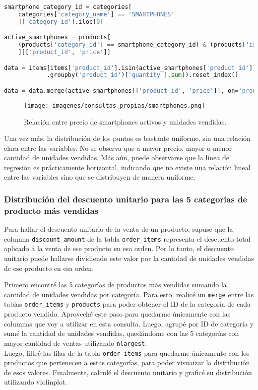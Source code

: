 \begin{lstlisting}[language=Python, xleftmargin=40pt, xrightmargin=40pt]
smartphone_category_id = categories[
    categories['category_name'] == 'SMARTPHONES'
    ]['category_id'].iloc[0]

active_smartphones = products[
    (products['category_id'] == smartphone_category_id) & (products['is_active'])
    ][['product_id', 'price']]

data = items[items['product_id'].isin(active_smartphones['product_id'])]
            .groupby('product_id')['quantity'].sum().reset_index()

data = data.merge(active_smartphones[['product_id', 'price']], on='product_id', how='left')
\end{lstlisting}

\begin{figure}[H]
    \centering
    \texttt{[image: imagenes/consultas\_propias/smartphones.png]}
    \caption{Relación entre precio de smartphones activos y unidades vendidas.}
    \label{fig:smartphone_price_vs_quantity}
\end{figure}

Una vez más, la distribución de los puntos es bastante uniforme, sin una relación clara entre las variables. No se observa que a mayor precio, mayor o menor cantidad de unidades vendidas. Más aún, puede observarse que la línea de regresión es prácticamente horizontal, indicando que no existe una relación lineal entre las variables sino que se distribuyen de manera uniforme.

\subsubsection{Distribución del descuento unitario para las 5 categorías de producto más vendidas}

Para hallar el descuento unitario de la venta de un producto, supuse que la columna \texttt{discount\_amount} de la tabla \texttt{order\_items} representa el descuento total aplicado a la venta de ese producto en esa orden. Por lo tanto, el descuento unitario puede hallarse dividiendo este valor por la cantidad de unidades vendidas de ese producto en esa orden.

Primero encontré las 5 categorías de productos más vendidas sumando la cantidad de unidades vendidas por categoría. Para esto, realicé un \texttt{merge} entre las tablas \texttt{order\_items} y \texttt{products} para poder obtener el ID de la categoría de cada producto vendido. Aproveché este  paso para quedarme únicamente con las columnas que voy a utilizar en esta consulta. Luego, agrupé por ID de categoría y sumé la cantidad de unidades vendidas, quedándome con las 5 categorías con mayor cantidad de ventas utilizando \texttt{nlargest}. \\
Luego, filtré las filas de la tabla \texttt{order\_items} para quedarme únicamente con los productos que pertenecen a estas categorías, para poder visuaizar la distribución de esos valores. Finalmente, calculé el descuento unitario y graficé su distribución utilizando violinplot.

